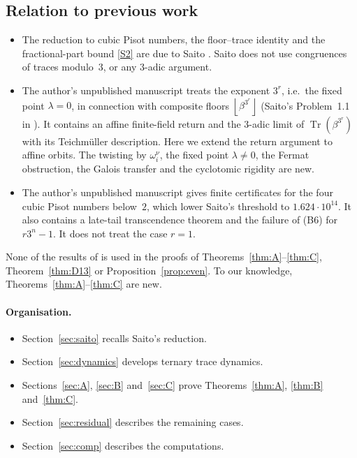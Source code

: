 \documentclass[11pt,a4paper]{article}
\theoremstyle{definition}
\theoremstyle{remark}
\DeclareMathOperator{\Tr}{Tr}
\newcommand{\floor}[1]{\left\lfloor #1\right\rfloor}
\begin{document}
\subsection{Relation to previous work}
\begin{itemize}
\item The reduction to cubic Pisot numbers, the floor--trace identity and the fractional-part bound \ref{S2} are due to Saito \cite[Proposition~3.2]{SaiVar}. Saito does not use congruences of traces modulo~$3$, or any $3$-adic argument.
\item The author's unpublished manuscript \cite{K009} treats the exponent $3^r$, i.e.\ the fixed point $\lambda=0$, in connection with composite floors $\floor{\beta^{3^r}}$ (Saito's Problem~1.1 in \cite{SaiInt}). It contains an affine finite-field return and the $3$-adic limit of $\Tr(\beta^{3^r})$ with its Teichm\"uller description. Here we extend the return argument to affine orbits. The twisting by $\omega_i^{\nu}$, the fixed point $\lambda\ne0$, the Fermat obstruction, the Galois transfer and the cyclotomic rigidity are new.
\item The author's unpublished manuscript \cite{K031} gives finite certificates for the four cubic Pisot numbers below~$2$, which lower Saito's threshold to $1.624\cdot10^{14}$. It also contains a late-tail transcendence theorem and the failure of (B6) for $r3^n-1$. It does not treat the case $r=1$.
\end{itemize}
None of the results of \cite{K009,K031,K042} is used in the proofs of Theorems~\ref{thm:A}--\ref{thm:C}, Theorem~\ref{thm:D13} or Proposition~\ref{prop:even}.
To our knowledge, Theorems~\ref{thm:A}--\ref{thm:C} are new.

\paragraph{Organisation.}
\begin{itemize}
\item Section~\ref{sec:saito} recalls Saito's reduction.
\item Section~\ref{sec:dynamics} develops ternary trace dynamics.
\item Sections~\ref{sec:A}, \ref{sec:B} and~\ref{sec:C} prove Theorems~\ref{thm:A}, \ref{thm:B} and~\ref{thm:C}.
\item Section~\ref{sec:residual} describes the remaining cases.
\item Section~\ref{sec:comp} describes the computations.
\end{itemize}
\end{document}
